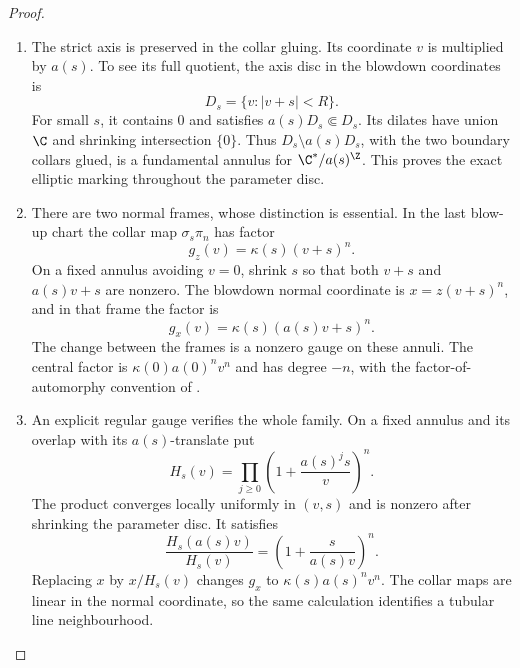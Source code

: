 \begin{proof}
\begin{enumerate}[label=\arabic*.,leftmargin=*]
\item The strict axis is preserved in the collar gluing. Its coordinate
$v$ is multiplied by $a(s)$. To see its full quotient, the axis disc
in the blowdown coordinates is
\[
 D_s=\{v:|v+s|<R\}.
\]
For small $s$, it contains $0$ and satisfies $a(s)D_s\Subset D_s$.
Its dilates have union $\C$ and shrinking intersection $\{0\}$.
Thus $D_s\setminus a(s)D_s$, with the two boundary collars glued,
is a fundamental annulus for $\C^*/a(s)^\Z$.
This proves the exact elliptic marking throughout the parameter disc.

\item There are two normal frames, whose distinction is essential.
In the last blow-up chart the collar map $\sigma_s\pi_n$ has factor
\[
 g_z(v)=\kappa(s)(v+s)^n.
\]
On a fixed annulus avoiding $v=0$, shrink $s$ so that both
$v+s$ and $a(s)v+s$ are nonzero. The blowdown normal coordinate is
$x=z(v+s)^n$, and in that frame the factor is
\[
 g_x(v)=\kappa(s)(a(s)v+s)^n.
\]
The change between the frames is a nonzero gauge on these annuli.
The central factor is $\kappa(0)a(0)^n v^n$ and has degree $-n$,
with the factor-of-automorphy convention of
\citet[Proposition 5.6, pp.1369--1370]{IstratiEtAl2022Root}.

\item An explicit regular gauge verifies the whole family. On a fixed
annulus and its overlap with its $a(s)$-translate put
\[
 H_s(v)=\prod_{j\ge0}\left(1+\frac{a(s)^j s}{v}\right)^n.
\]
The product converges locally uniformly in $(v,s)$ and is nonzero
after shrinking the parameter disc. It satisfies
\[
 \frac{H_s(a(s)v)}{H_s(v)}
      =\left(1+\frac{s}{a(s)v}\right)^n.
\]
Replacing $x$ by $x/H_s(v)$ changes $g_x$ to
$\kappa(s)a(s)^n v^n$.
The collar maps are linear in the normal coordinate, so the same
calculation identifies a tubular line neighbourhood.


\end{enumerate}
\end{proof}
